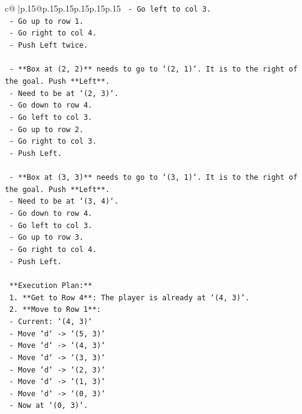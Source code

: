 \documentclass{article}
\begin{document}
{\begin{supertabular}{c@{$\;$}|p{.15\linewidth}@{}p{.15\linewidth}p{.15\linewidth}p{.15\linewidth}p{.15\linewidth}p{.15\linewidth}}
{{{\texttt{        {-} Go left to col 3.} \\
\texttt{        {-} Go up to row 1.} \\
\texttt{        {-} Go right to col 4.} \\
\texttt{        {-} Push Left twice.} \\
\\ 
\texttt{    {-} **Box at (2, 2)** needs to go to `(2, 1)`. It is to the right of the goal. Push **Left**.} \\
\texttt{      {-} Need to be at `(2, 3)`.} \\
\texttt{      {-} Go down to row 4.} \\
\texttt{      {-} Go left to col 3.} \\
\texttt{      {-} Go up to row 2.} \\
\texttt{      {-} Go right to col 3.} \\
\texttt{      {-} Push Left.} \\
\\ 
\texttt{    {-} **Box at (3, 3)** needs to go to `(3, 1)`. It is to the right of the goal. Push **Left**.} \\
\texttt{      {-} Need to be at `(3, 4)`.} \\
\texttt{      {-} Go down to row 4.} \\
\texttt{      {-} Go left to col 3.} \\
\texttt{      {-} Go up to row 3.} \\
\texttt{      {-} Go right to col 4.} \\
\texttt{      {-} Push Left.} \\
\\ 
\texttt{    **Execution Plan:**} \\
\texttt{    1.  **Get to Row 4**: The player is already at `(4, 3)`.} \\
\texttt{    2.  **Move to Row 1**:} \\
\texttt{        {-} Current: `(4, 3)`} \\
\texttt{        {-} Move `d` {-}> `(5, 3)`} \\
\texttt{        {-} Move `d` {-}> `(4, 3)`} \\
\texttt{        {-} Move `d` {-}> `(3, 3)`} \\
\texttt{        {-} Move `d` {-}> `(2, 3)`} \\
\texttt{        {-} Move `d` {-}> `(1, 3)`} \\
\texttt{        {-} Move `d` {-}> `(0, 3)`} \\
\texttt{        {-} Now at `(0, 3)`.} \\
}}}
\end{supertabular}}
\end{document}
